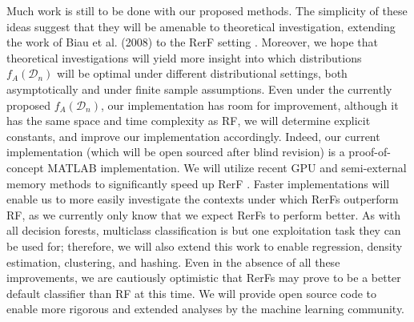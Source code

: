 \documentclass{article} %
\providecommand{\mc}[1]{\mathcal{#1}}
\begin{document}
Much work is still to be done with our proposed methods. 
The simplicity of these ideas suggest that they will be amenable to theoretical investigation, extending the work of Biau et al. (2008) to the RerF setting \cite{biau2008}.  Moreover, we hope that theoretical investigations will yield more insight into which distributions $f_A(\mc{D}_n)$ will be optimal under different distributional settings, both asymptotically and under finite sample assumptions.  
Even under the currently proposed $f_A(\mc{D}_n)$, our implementation has room for improvement, although it has the same space and time complexity as RF, we will determine explicit constants, and improve our implementation accordingly.  Indeed, our current implementation (which will be open sourced after blind revision) is a proof-of-concept MATLAB implementation.  We will utilize recent GPU and semi-external memory methods to significantly speed up RerF \cite{zheng15flashgraph}.  
Faster implementations will enable us to more easily investigate the contexts under which RerFs outperform RF, as we currently only know that we expect RerFs to perform better.
As with all decision forests, multiclass classification is but one exploitation task they can be used for; therefore, we will also extend this work to enable regression, density estimation, clustering, and hashing.
Even in the absence of all these improvements, we are cautiously optimistic that RerFs may prove to be a better default classifier than RF at this time. We will provide open source code to enable more rigorous and extended analyses by the machine learning community.
\end{document}
